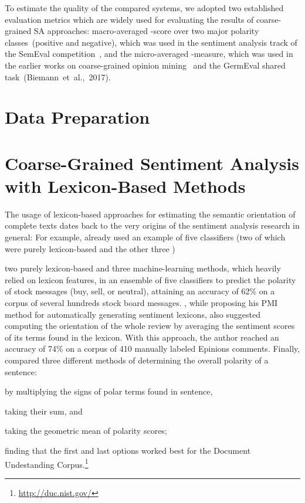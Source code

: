 To estimate the quality of the compared systems, we adopted two
established evaluation metrics which are widely used for evaluating
the results of coarse-grained SA approaches: macro-averaged \F-score
over two major polarity classes~(positive and negative), which was
used in the sentiment analysis track of the SemEval
competition~\cite{Nakov:13,Rosenthal:14,Rosenthal:15}, and the
micro-averaged \F-measure, which was used in the earlier works on
coarse-grained opinion
mining~\cite{Wiebe:99,Das:01,Read:05,Kennedy:06,} and the GermEval
shared task~(Biemann~et~al.,~2017).



\section{Data Preparation}\label{sec:cgsa:data}

\section{Coarse-Grained Sentiment Analysis with Lexicon-Based
  Methods}\label{sec:cgsa:lexicon-based}

The usage of lexicon-based approaches for estimating the semantic
orientation of complete texts dates back to the very origins of the
sentiment analysis research in general: For example, \citet{Das:01}
already used an example of five classifiers (two of which were purely
lexicon-based and the other three )

two purely lexicon-based and three machine-learning
methods, which heavily relied on lexicon features, in an ensemble of
five classifiers to predict the polarity of stock messages (buy, sell,
or neutral), attaining an accuracy of 62\% on a corpus of several
hundreds stock board messages.  \citet{Turney:02}, while proposing his
PMI method for automatically generating sentiment lexicons, also
suggested computing the orientation of the whole review by averaging
the sentiment scores of its terms found in the lexicon.  With this
approach, the author reached an accuracy of 74\% on a corpus of 410
manually labeled Epinions comments.  Finally, \citet{Kim:04} compared
three different methods of determining the overall polarity of a
sentence:
\begin{inparaenum}[(i)]
  \item by multiplying the signs of polar terms found in sentence,
  \item taking their sum, and
  \item taking the geometric mean of polarity scores;
\end{inparaenum}
finding that the first and last options worked best for the Document
Undestanding Corpus.\footnote{\url{http://duc.nist.gov/}}

